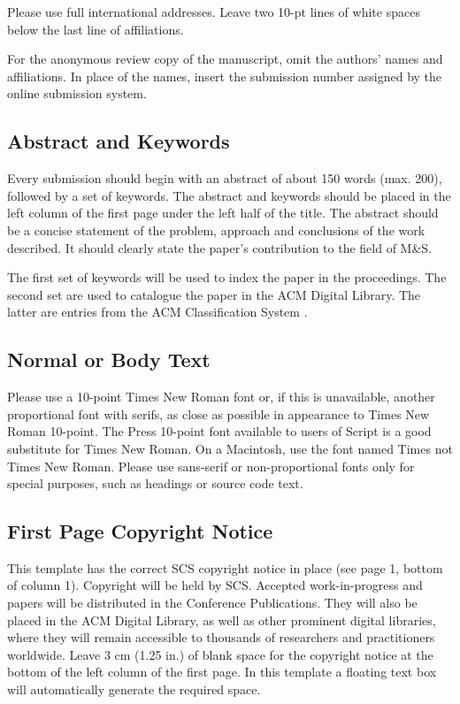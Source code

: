 \documentclass{scsSimAUDPaperFormat}
\begin{document}
Please use full international addresses. Leave two 10-pt lines of white spaces below the last line of affiliations. 

For the anonymous review copy of the manuscript, omit the authors’ names and affiliations. In place of the names, insert the submission number assigned by the online submission system.

\subsection{Abstract and Keywords}

Every submission should begin with an abstract of about 150 words (max. 200), followed by a set of keywords. The abstract and keywords should be placed in the left column of the first page under the left half of the title. The abstract should be a concise statement of the problem, approach and conclusions of the work described. It should clearly state the paper's contribution to the field of M\&S.

The first set of keywords will be used to index the paper in the proceedings. The second set are used to catalogue the paper in the ACM Digital Library. The latter are entries from the ACM Classification System \cite{acm_categories}.

\subsection{Normal or Body Text}

Please use a 10-point Times New Roman font or, if this is unavailable, another proportional font with serifs, as close as possible in appearance to Times New Roman 10-point. The Press 10-point font available to users of Script is a good substitute for Times New Roman. On a Macintosh, use the font named Times not Times New Roman. Please use sans-serif or non-proportional fonts only for special purposes, such as headings or source code text.

\subsection{First Page Copyright Notice}

This template has the correct SCS copyright notice in place (see page 1, bottom of column 1). Copyright will be held by SCS. Accepted work-in-progress and papers will be distributed in the Conference Publications. They will also be placed in the ACM Digital Library, as well as other prominent digital libraries, where they will remain accessible to thousands of researchers and practitioners worldwide. Leave 3 cm (1.25 in.) of blank space for the copyright notice at the bottom of the left column of the first page. In this template a floating text box will automatically generate the required space.
\end{document}
